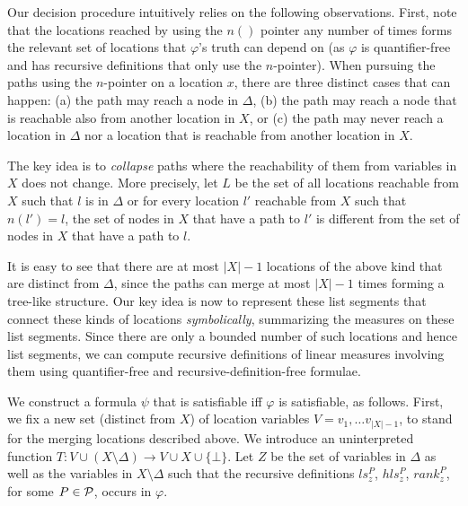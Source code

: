 Our decision procedure intuitively relies on the following observations. First, note that the locations
reached by using the $n()$ pointer any number of times forms the relevant set of locations that $\varphi$'s
truth can depend on (as $\varphi$ is quantifier-free and has recursive definitions that only use the $n$-pointer).
When pursuing the paths using the $n$-pointer on a location $x$, there are three distinct cases that can happen:
(a) the path may reach a node in $\Delta$, (b) the path may reach a node that is reachable also from another location in $X$,
or (c) the path may never reach a location in $\Delta$ nor a location that is reachable from another location in $X$. 

The key idea is to \emph{collapse} paths where the reachability of them from variables in $X$ does not change.
More precisely, let $L$ be the set of all locations reachable from $X$ such that $l$ is in $\Delta$ or 
for every location $l'$ reachable from $X$ such that $n(l')=l$, the set of nodes in $X$ that have a path
to $l'$ is different from the set of nodes in $X$ that have a path to $l$.

It is easy to see that there are at most $|X|-1$ locations of the above kind that are distinct from $\Delta$,
since the paths can merge at most $|X|-1$ times forming a tree-like structure. Our key idea is now to 
represent these list segments that connect these kinds of locations \emph{symbolically}, summarizing the 
measures on these list segments. Since there are only a bounded number of such locations and hence list
segments, we can compute recursive definitions of linear measures involving them using quantifier-free
and recursive-definition-free formulae.

We construct a formula $\psi$ that is satisfiable iff $\varphi$ is satisfiable, as follows.
First, we fix a new set (distinct from $X$) of location variables $V={v_1, \ldots v_{|X|-1}}$,
to stand for the merging locations described above.
We introduce an uninterpreted function $T: V \cup (X\setminus \Delta) \longrightarrow V \cup X \cup \{\bot\}$.
Let $Z$ be the set of variables in $\Delta$ as well as the variables in $X \setminus \Delta$ 
such that the recursive definitions $ls_z^P$, $hls_z^P$, $rank_z^P$, for some
$P \in {\cal P}$, occurs in $\varphi$.

